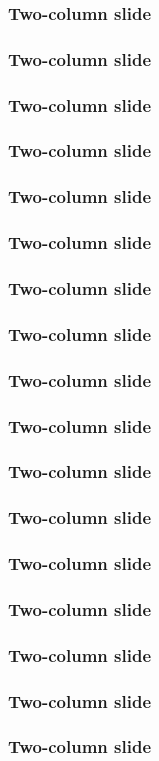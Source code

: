 \documentclass{beamer}
\begin{document}
\begin{frame}
	\frametitle{Two-column slide}	
\end{frame}


\begin{frame}
	\frametitle{Two-column slide}	
\end{frame}


\begin{frame}
	\frametitle{Two-column slide}	
\end{frame}

\begin{frame}
	\frametitle{Two-column slide}	
\end{frame}

\begin{frame}
	\frametitle{Two-column slide}	
\end{frame}


\begin{frame}
	\frametitle{Two-column slide}	
\end{frame}


\begin{frame}
	\frametitle{Two-column slide}	
\end{frame}


\begin{frame}
	\frametitle{Two-column slide}	
\end{frame}


\begin{frame}
	\frametitle{Two-column slide}	
\end{frame}

\begin{frame}
	\frametitle{Two-column slide}	
\end{frame}

\begin{frame}
	\frametitle{Two-column slide}	
\end{frame}


\begin{frame}
	\frametitle{Two-column slide}	
\end{frame}


\begin{frame}
	\frametitle{Two-column slide}	
\end{frame}


\begin{frame}
	\frametitle{Two-column slide}	
\end{frame}


\begin{frame}
	\frametitle{Two-column slide}	
\end{frame}

\begin{frame}
	\frametitle{Two-column slide}	
\end{frame}

\begin{frame}
	\frametitle{Two-column slide}	
\end{frame}
\end{document}
